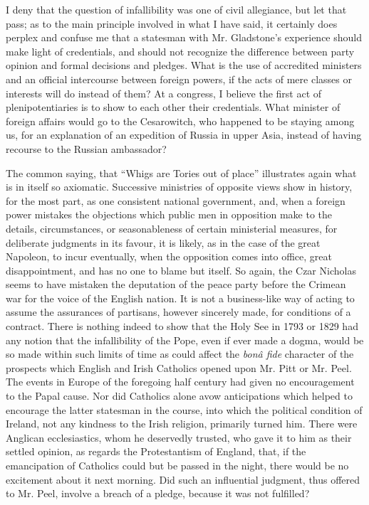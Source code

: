 I deny that the question of infallibility was one of civil
allegiance, but let that pass; as to the main principle involved in what
I have said, it certainly does perplex and confuse me that a statesman
with Mr. Gladstone's experience should make light of credentials, and
should not recognize the difference between party opinion and formal
decisions and pledges. What is the use of accredited ministers and an
official intercourse between foreign powers, if the acts of mere classes
or interests will do instead of them? At a congress, I believe the first
act of plenipotentiaries is to show to each other their credentials.
What minister of foreign affairs would go to the Cesarowitch, who
happened to be staying among us, for an explanation of an expedition of
Russia in upper Asia, instead of having recourse to the Russian
ambassador?

The common saying, that ``Whigs are Tories out of place''
illustrates again what is in itself so axiomatic. Successive ministries
of opposite views show in history, for the most part, as one
consistent national government, and, when a foreign power mistakes the
objections which public men in opposition make to the details,
circumstances, or seasonableness of certain ministerial measures, for
deliberate judgments in its favour, it is likely, as in the case of the
great Napoleon, to incur eventually, when the opposition comes into
office, great disappointment, and has no one to blame but itself. So
again, the Czar Nicholas seems to have mistaken the deputation of the
peace party before the Crimean war for the voice of the English nation.
It is not a business-like way of acting to assume the assurances of
partisans, however sincerely made, for conditions of a contract. There
is nothing indeed to show that the Holy See in 1793 or 1829 had any
notion that the infallibility of the Pope, even if ever made a dogma,
would be so made within such limits of time as could affect the \emph{bonâ
fide} character of the prospects which English and Irish Catholics
opened upon Mr. Pitt or Mr. Peel. The events in Europe of the foregoing
half century had given no encouragement to the Papal cause. Nor did
Catholics alone avow anticipations which helped to encourage the latter
statesman in the course, into which the political condition of Ireland,
not any kindness to the Irish religion, primarily turned him. There were
Anglican ecclesiastics, whom he deservedly trusted, who gave it to him
as their settled opinion, as regards the Protestantism of England, that,
if the emancipation of Catholics could but be passed in the night, there
would be no excitement about it next morning. Did such an influential
judgment, thus offered to Mr. Peel, involve a breach of a pledge,
because it was not fulfilled?

